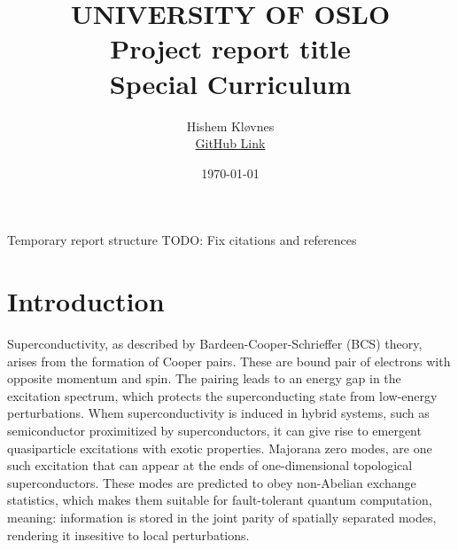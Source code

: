 \documentclass[11pt, letterpaper, titlepage]{article}
\title{
 \textbf{\LARGE UNIVERSITY OF OSLO} \\
\vspace{37mm}
\textbf{\Large Project report title}\\
\vspace{7mm}
\Large Special Curriculum \\
\vspace{25mm}
}
\author{\Large Hishem Kløvnes \\ \textcolor{blue}{\href{https://github.com/hishemok/Special_curriculum}{GitHub Link} }}
\date{\Large \today} %
\begin{document}
\sloppy
\maketitle
\newpage



\Large Temporary report structure
\Large TODO: Fix citations and references
\section{Introduction}
Superconductivity, as described by Bardeen-Cooper-Schrieffer (BCS) theory, arises from the formation of Cooper pairs. These are bound pair of electrons with opposite momentum and spin. The pairing leads to an energy gap in the excitation spectrum, which protects the superconducting state from low-energy perturbations. Whem superconductivity is induced in hybrid systems, such as semiconductor proximitized by superconductors, it can give rise to emergent quasiparticle excitations with exotic properties. Majorana zero modes, are one such excitation that can appear at the ends of one-dimensional topological superconductors. These modes are predicted to obey non-Abelian exchange statistics, which makes them suitable for fault-tolerant quantum computation, meaning: information is stored in the joint parity of spatially separated modes, rendering it insesitive to local perturbations.\\ \\
\end{document}
